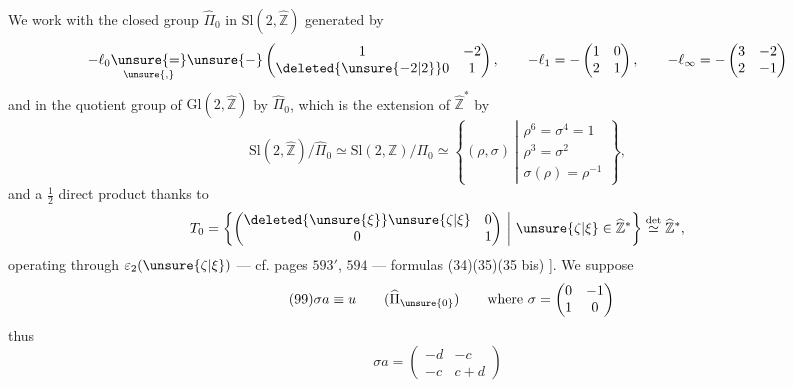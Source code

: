 We  work with the closed group
$\widehat\Pi_0$ in $\mathrm{Sl}(2,\widehat{\mathbb Z})$ generated by
\[
\begin{gathered}
-\ell_0\underset{\unsure{,}}{\unsure{=}}\unsure{-}\begin{pmatrix}
1&-2\\\deleted{\unsure{-2|2}}0&1
\end{pmatrix},\qquad
-\ell_1=-\begin{pmatrix}1&0\\2&1\end{pmatrix},\qquad
-\ell_\infty=-\begin{pmatrix}3&-2\\2&-1\end{pmatrix}
\end{gathered}
\]
and in the quotient group of
$\mathrm{Gl}(2,\widehat{\mathbb Z})$ by $\widehat\Pi_0$, which is
 the extension of
$\widehat{\mathbb Z}^{*}$ by
\[
\mathrm{Sl}(2,\widehat{\mathbb Z})/\widehat\Pi_0
\simeq\mathrm{Sl}(2,\mathbb Z)/\Pi_0
\simeq\left\{(\rho,\sigma)\ \left|\begin{array}{l}
\rho^6=\sigma^4=1\\
\rho^3=\sigma^2\\
\sigma(\rho)=\rho^{-1}
\end{array}\right.\right\},
\]
 and  a $\frac12$ direct product thanks to
\[
T_0=\left\{\begin{pmatrix}
\deleted{\unsure{\xi}}\unsure{\zeta|\xi}&0\\0&1
\end{pmatrix}\ \middle|\ \unsure{\zeta|\xi}\in\widehat{\mathbb Z}^{*}\right\}
\overset{\det}{\simeq}\widehat{\mathbb Z}^{*},
\]
operating through $\varepsilon_2(\unsure{\zeta|\xi})$
--- cf. pages $593'$, $594$ --- formulas (34)(35)(35 bis) ].
We  suppose
\[
\tag{99}
\sigma a\equiv u\qquad(\widehat\Pi_{\unsure{0}})
\qquad\text{where }\sigma=\begin{pmatrix}0&-1\\1&0\end{pmatrix}
\]
thus
\[
\tag{100}
\sigma a=\begin{pmatrix}-d&-c\\-c&c+d\end{pmatrix}
\]

